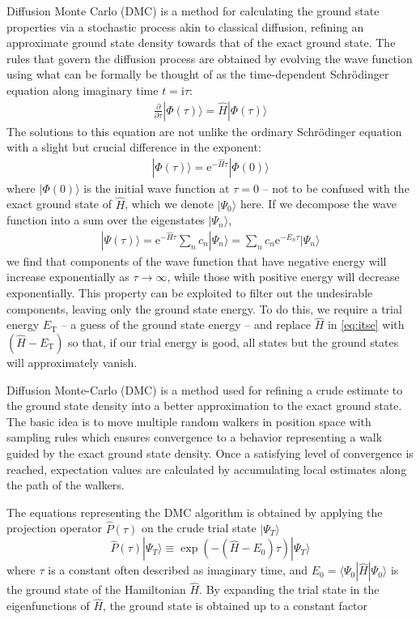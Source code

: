 \documentclass[amsmath, amssymb, aps, floatfix, nofootinbib, preprintnumbers,showpacs, superscriptaddress, twocolumn]{revtex4-1}
\newcommand{\ket}[1]{| #1 \rangle}
\newcommand{\bra}[1]{\langle #1 |}
\begin{document}
Diffusion Monte Carlo (DMC) is a method for calculating the ground state
properties via a stochastic process akin to classical diffusion, refining an
approximate ground state density towards that of the exact ground state.  The
rules that govern the diffusion process are obtained by evolving the wave
function using what can be formally be thought of as the time-dependent
Schr\"odinger equation along imaginary time $t = \mathrm i \tau$:
\begin{align} \label{eq:itse}
  \frac{\partial}{\partial \tau} |\Phi(\tau)\rangle = \hat H |\Phi(\tau)\rangle
\end{align}
The solutions to this equation are not unlike the ordinary Schr\"odinger
equation with a slight but crucial difference in the exponent:
\begin{align*}
  |\Phi(\tau)\rangle = \mathrm e^{-\hat H \tau} |\Phi(0)\rangle
\end{align*}
where $|\Phi(0)\rangle$ is the initial wave function at $\tau = 0$ -- not to
be confused with the exact ground state of $\hat H$, which we denote
$|\Psi_0\rangle$ here.  If we decompose the wave function into a sum over the
eigenstates $|\Psi_n\rangle$,
\begin{align*}
  |\Psi(\tau)\rangle
  = \mathrm e^{-\hat H \tau} \sum_n c_n |\Psi_n\rangle
  = \sum_n c_n \mathrm e^{-E_n \tau} |\Psi_n\rangle
\end{align*}
we find that components of the wave function that have negative energy will
increase exponentially as $\tau \to \infty$, while those with positive energy
will decrease exponentially.  This property can be exploited to filter out the
undesirable components, leaving only the ground state energy.  To do this, we
require a trial energy $E_{\text{T}}$ -- a guess of the ground state energy --
and replace $\hat H$ in \eqref{eq:itse} with $(\hat H - E_{\text{T}})$ so
that, if our trial energy is good, all states but the ground states will
approximately vanish.

Diffusion Monte-Carlo (DMC) is a method used for refining a crude estimate to the ground state density into a better approximation to the exact ground state. The basic idea is to move multiple random walkers in position space with sampling rules which ensures convergence to a behavior representing a walk guided by the exact ground state density. Once a satisfying level of convergence is reached, expectation values are calculated by accumulating local estimates along the path of the walkers.

The equations representing the DMC algorithm is obtained by applying the projection operator $\hat{P}(\tau)$ on the crude trial state $\ket{\Psi_T}$
\begin{equation}
 \hat{P}(\tau)\ket{\Psi_T} \equiv \exp\left({-(\hat{H} - E_0)\tau}\right)\ket{\Psi_T}
\end{equation}
\noindent
where $\tau$ is a constant often described as imaginary time, and $E_0=\bra{\Psi_0}\hat{H}\ket{\Psi_0}$ is the ground state of the Hamiltonian $\hat{H}$. By expanding the trial state in the eigenfunctions of $\hat{H}$, the ground state is obtained up to a constant factor
\end{document}
